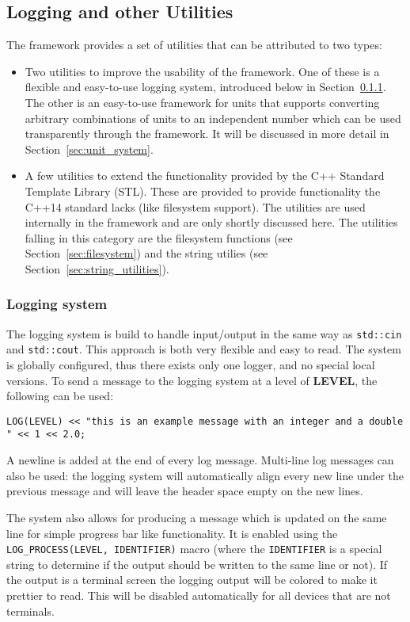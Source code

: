 \subsection{Logging and other Utilities}
\label{sec:logging_utilities}
The \apsq framework provides a set of utilities that can be attributed to two types:
\begin{itemize}
\item Two utilities to improve the usability of the framework.
One of these is a flexible and easy-to-use logging system, introduced below in Section~\ref{sec:logger}.
The other is an easy-to-use framework for units that supports converting arbitrary combinations of units to an independent number which can  be used transparently through the framework.
It will be discussed in more detail in Section~\ref{sec:unit_system}.
\item A few utilities to extend the functionality provided by the C++ Standard Template Library (STL).
These are provided to provide functionality the C++14 standard lacks (like filesystem support).
The utilities are used internally in the framework and are only shortly discussed here.
The utilities falling in this category are the filesystem functions (see Section~\ref{sec:filesystem}) and the string utilies (see Section~\ref{sec:string_utilities}).
\end{itemize}

\subsubsection{Logging system}
\label{sec:logger}
The logging system is build to handle input/output in the same way as \texttt{std::cin} and \texttt{std::cout}.
This approach is both very flexible and easy to read.
The system is globally configured, thus there exists only one logger, and no special local versions.
To send a message to the logging system at a level of \textbf{LEVEL}, the following can be used:
\begin{verbatim}
LOG(LEVEL) << "this is an example message with an integer and a double " << 1 << 2.0;
\end{verbatim}
A newline is added at the end of every log message.
Multi-line log messages can also be used: the logging system will automatically align every new line under the previous message and will leave the header space empty on the new lines.

The system also allows for producing a message which is updated on the same line for simple progress bar like functionality.
It is enabled using the \texttt{LOG\_PROCESS(LEVEL, IDENTIFIER)} macro (where the \texttt{IDENTIFIER} is a special string to determine if the output should be written to the same line or not).
If the output is a terminal screen the logging output will be colored to make it prettier to read.
This will be disabled automatically for all devices that are not terminals.

